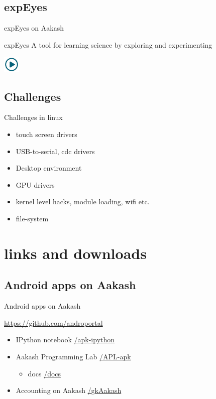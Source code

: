 \documentclass{beamer}
\begin{document}
\subsection{expEyes}
\begin{frame}{expEyes on Aakash}
  \begin{block}{expEyes}
    A tool for learning science by exploring and experimenting
  \end{block}
   \centerline{\href{file:///home/sachin/github/slides/scipy2012/expEyes.3gp}{\includegraphics[height=0.8cm,width=0.8cm]{play.jpg}}}
\end{frame}

\subsection{Challenges}
\begin{frame}{Challenges in linux}
  \begin{block}{}
    \begin{itemize}
        \item touch screen drivers
        \item USB-to-serial, cdc drivers
        \item Desktop environment
        \item GPU drivers
        \item kernel level hacks, module loading, wifi etc.
        \item file-system
    \end{itemize}
  \end{block}
\end{frame}

\section{links and downloads}
\subsection{Android apps on Aakash}
\begin{frame}{Android apps on Aakash}
  \begin{block}{\url{https://github.com/androportal}}
    \begin{itemize}
      \item IPython notebook \hfill \url{/apk-ipython}
      \item Aakash Programming Lab \hfill \url{/APL-apk}
        \begin{itemize}
        \item docs \hfill \url{/docs}
        \end{itemize}
      \item Accounting on Aakash \hfill \url{/gkAakash}
    \end{itemize}
  \end{block}
\end{frame}
\end{document}
